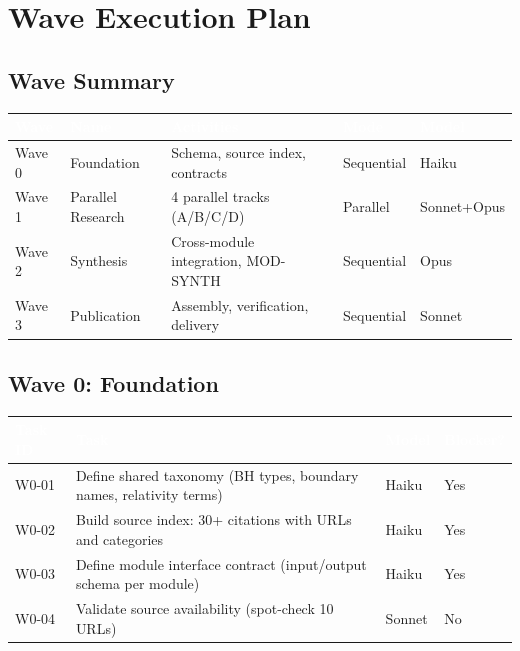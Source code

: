 \documentclass[11pt,letterpaper]{article}
\newcommand{\tableheader}[1]{\textbf{\sffamily\textcolor{white}{#1}}}
\begin{document}
\section{Wave Execution Plan}

\subsection{Wave Summary}

\begin{center}
\begin{tabularx}{\textwidth}{C{1.5cm}L{3cm}L{3cm}C{2cm}C{2cm}}
\toprule
{}
\tableheader{Wave} & \tableheader{Name} & \tableheader{Activities} & \tableheader{Mode} & \tableheader{Model} \\
\midrule
Wave 0 & Foundation & Schema, source index, contracts & Sequential & Haiku \\
Wave 1 & Parallel Research & 4 parallel tracks (A/B/C/D) & Parallel & Sonnet+Opus \\
Wave 2 & Synthesis & Cross-module integration, MOD-SYNTH & Sequential & Opus \\
Wave 3 & Publication & Assembly, verification, delivery & Sequential & Sonnet \\
\bottomrule
\end{tabularx}
\end{center}

\subsection{Wave 0: Foundation}

\begin{center}
\begin{tabularx}{\textwidth}{L{2.5cm}XC{2cm}C{2cm}}
\toprule
{}
\tableheader{Task ID} & \tableheader{Task} & \tableheader{Model} & \tableheader{Blocker?} \\
\midrule
W0-01 & Define shared taxonomy (BH types, boundary names, relativity terms) & Haiku & Yes \\
W0-02 & Build source index: 30+ citations with URLs and categories & Haiku & Yes \\
W0-03 & Define module interface contract (input/output schema per module) & Haiku & Yes \\
W0-04 & Validate source availability (spot-check 10 URLs) & Sonnet & No \\
\bottomrule
\end{tabularx}
\end{center}
\end{document}
